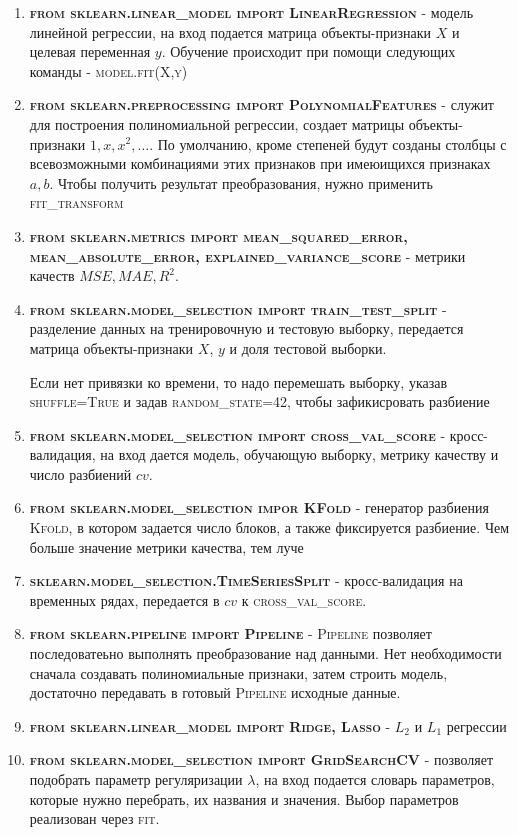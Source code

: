 \documentclass[aps,%
12pt,%
final,%
oneside,
onecolumn,%
musixtex, %
superscriptaddress,%
centertags]{article} %
\theoremstyle{plain}
\theoremstyle{definition}
\theoremstyle{remark}
\begin{document}
\begin{enumerate}
	\item \textbf{\textsc{from sklearn.linear\_model import LinearRegression}} - модель линейной регрессии, на вход подается матрица объекты-признаки $X$ и целевая переменная $y$. Обучение происходит при помощи следующих команды - \textsc{model.fit(X,y)}
	\item \textbf{\textsc{from sklearn.preprocessing import PolynomialFeatures}} - служит для построения полиномиальной регрессии, создает матрицы объекты-признаки $1,x,x^2,\ldots$. По умолчанию, кроме степеней будут созданы столбцы с всевозможными комбинациями этих признаков при имеюищихся признаках $a,b$. Чтобы получить результат преобразования, нужно применить \textsc{fit\_transform}
	\item \textbf{\textsc{from sklearn.metrics import mean\_squared\_error, mean\_absolute\_error, explained\_variance\_score}} - метрики качеств $MSE, MAE, R^2$.
	\item \textbf{\textsc{from sklearn.model\_selection import train\_test\_split}} - разделение данных на тренировочную и тестовую выборку, передается матрица объекты-признаки $X$, $y$ и доля тестовой выборки.

	Если нет привязки ко времени, то надо перемешать выборку, указав \textsc{shuffle=True} и задав \textsc{random\_state=42}, чтобы зафикисровать разбиение

	\item \textbf{\textsc{from sklearn.model\_selection import cross\_val\_score}} - кросс-валидация, на вход дается модель, обучающую выборку, метрику качеству и число разбиений $cv$.
	\item \textbf{\textsc{from sklearn.model\_selection impor KFold}} - генератор разбиения \textsc{Kfold}, в котором задается число блоков, а также фиксируется разбиение. Чем больше значение метрики качества, тем луче
	\item \textbf{\textsc{sklearn.model\_selection.TimeSeriesSplit}} - кросс-валидация на временных рядах, передается в $cv$ к \textsc{cross\_val\_score}.
	\item \textbf{\textsc{from sklearn.pipeline import Pipeline}} - \textsc{Pipeline} позволяет последоватеьно выполнять преобразование над данными. Нет необходимости сначала создавать полиномиальные признаки, затем строить модель, достаточно передавать в готовый \textsc{Pipeline} исходные данные.
	\item \textbf{\textsc{from sklearn.linear\_model import Ridge, Lasso}} - $L_2$ и $L_1$ регрессии
	\item \textbf{\textsc{from sklearn.model\_selection import GridSearchCV}} - позволяет подобрать параметр регуляризации $\lambda$, на вход подается словарь параметров, которые нужно перебрать, их названия и значения. Выбор параметров реализован через \textsc{fit}.
\end{enumerate}
\end{document}
